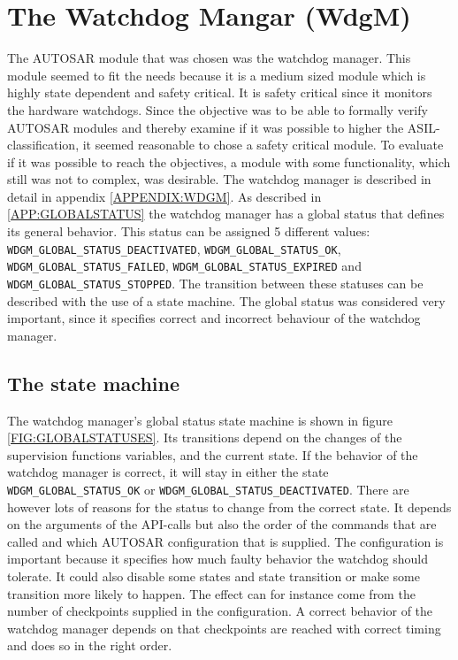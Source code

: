 \section{The Watchdog Mangar (WdgM)}
The AUTOSAR module that was chosen was the watchdog manager. This
module seemed to fit the needs because it is a medium sized module
which is highly state dependent and safety critical. It is safety
critical since it monitors the hardware watchdogs. Since the objective
was to be able to formally verify AUTOSAR modules and thereby examine
if it was possible to higher the ASIL-classification, it seemed
reasonable to chose a safety critical module. To evaluate if it was
possible to reach the objectives, a module with some functionality,
which still was not to complex, was desirable.  The watchdog manager
is described in detail in appendix \ref{APPENDIX:WDGM}. As described
in \ref{APP:GLOBALSTATUS} the watchdog manager has a global status
that defines its general behavior. This status can be assigned 5
different values: \lstinline!WDGM_GLOBAL_STATUS_DEACTIVATED!,
\lstinline!WDGM_GLOBAL_STATUS_OK!,
\lstinline!WDGM_GLOBAL_STATUS_FAILED!,
\lstinline!WDGM_GLOBAL_STATUS_EXPIRED! and
\lstinline!WDGM_GLOBAL_STATUS_STOPPED!. The transition between these
statuses can be described with the use of a state machine. The global
status was considered very important, since it specifies correct and
incorrect behaviour of the watchdog manager.

\subsection{The state machine}
The watchdog manager's global status state machine is shown in figure
\ref{FIG:GLOBALSTATUSES}. Its transitions depend on the changes of the
supervision functions variables, and the current state. If the
behavior of the watchdog manager is correct, it will stay in either
the state \lstinline!WDGM_GLOBAL_STATUS_OK! or
\lstinline!WDGM_GLOBAL_STATUS_DEACTIVATED!. There are however lots of
reasons for the status to change from the correct state. It depends on
the arguments of the API-calls but also the order of the commands that
are called and which AUTOSAR configuration that is supplied. The
configuration is important because it specifies how much faulty
behavior the watchdog should tolerate. It could also disable some
states and state transition or make some transition more likely to
happen. The effect can for instance come from the number of
checkpoints supplied in the configuration. A correct behavior of the
watchdog manager depends on that checkpoints are reached with correct
timing and does so in the right order.

